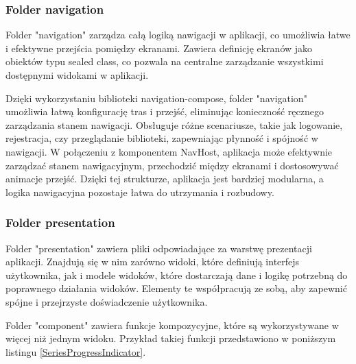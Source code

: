 \documentclass[12pt,twoside]{article}
\begin{document}
\subsubsection{Folder navigation}

Folder "navigation" zarządza całą logiką nawigacji w aplikacji, co umożliwia łatwe i efektywne przejścia pomiędzy 
ekranami. Zawiera definicję ekranów jako obiektów typu sealed class, co pozwala na centralne zarządzanie wszystkimi 
dostępnymi widokami w aplikacji.

Dzięki wykorzystaniu biblioteki navigation-compose, folder "navigation" umożliwia łatwą konfigurację tras i przejść, 
eliminując konieczność ręcznego zarządzania stanem nawigacji. Obsługuje różne scenariusze, takie jak logowanie, 
rejestracja, czy przeglądanie biblioteki, zapewniając płynność i spójność w nawigacji. 
W połączeniu z komponentem NavHost, aplikacja może efektywnie zarządzać stanem nawigacyjnym, przechodzić między 
ekranami i dostosowywać animacje przejść. Dzięki tej strukturze, aplikacja jest bardziej modularna, a logika 
nawigacyjna pozostaje łatwa do utrzymania i rozbudowy.

\subsubsection{Folder presentation}

Folder "presentation" zawiera pliki odpowiadające za warstwę prezentacji aplikacji. Znajdują się w nim zarówno widoki, 
które definiują interfejs użytkownika, jak i modele widoków, które dostarczają dane i logikę potrzebną do poprawnego 
działania widoków. Elementy te współpracują ze sobą, aby zapewnić spójne i przejrzyste doświadczenie użytkownika.

Folder "component" zawiera funkcje kompozycyjne, które są wykorzystywane w więcej niż jednym widoku. Przykład takiej 
funkcji przedstawiono w poniższym listingu \ref{SeriesProgressIndicator}.
\end{document}
